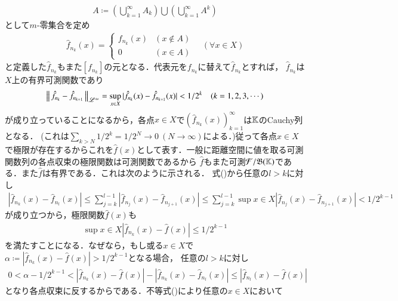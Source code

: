 \begin{qst}
\begin{prf}
\begin{description}
\begin{align}
				A \coloneqq \left( \bigcup_{k=1}^{\infty} A_k \right) \bigcup \left( \bigcup_{k=1}^{\infty} A^k \right)
			\end{align}
			として$m$-零集合を定め
			\begin{align}
				\hat{f}_{n_k}(x) =
				\begin{cases}
					f_{n_k}(x) & (x \notin A) \\
					0 & (x \in A)
				\end{cases}
				\quad (\forall x \in X)
			\end{align}
			と定義した$\hat{f}_{n_k}$もまた$[f_{n_k}]$の元となる．代表元を$f_{n_k}$に替えて$\hat{f}_{n_k}$とすれば，
			$\hat{f}_{n_k}$は$X$上の有界可測関数であり
			\begin{align}
				\left\|\, \hat{f}_{n_k} - \hat{f}_{n_{k+1}}\, \right\|_{\mathscr{L}^\infty} = \operatorname*{sup}_{x \in X} |\hat{f}_{n_k}(x) - \hat{f}_{n_{k+1}}(x)| < 1/2^k \quad (k=1,2,3,\cdots) 
				\label{ineq:Lp_banach_1}
			\end{align}
			が成り立っていることになるから，各点$x \in X$で$\left( \hat{f}_{n_k}(x) \right)_{k=1}^{\infty}$は$\mathbb{K}$のCauchy列となる．
			(これは$\sum_{k > N} 1/2^k = 1/2^N \longrightarrow 0\ (N \longrightarrow \infty)$による．)従って各点$x \in X$
			で極限が存在するからこれを$\hat{f}(x)$として表す．一般に距離空間に値を取る可測関数列の各点収束の極限関数は可測関数であるから
			$\hat{f}$もまた可測$\mathcal{F}/\mathfrak{B}(\mathbb{K})$である．また$\hat{f}$は有界である．これは次のように示される．
			式()から任意の$l > k$に対し
			\begin{align}
				|\hat{f}_{n_k}(x) - \hat{f}_{n_l}(x)| \leq \sum_{j=k}^{l-1} |\hat{f}_{n_{j}}(x) - \hat{f}_{n_{j+1}}(x)| 
				\leq \sum_{j=k}^{l-1} \sup{x \in X}{|\hat{f}_{n_j}(x) - \hat{f}_{n_{j+1}}(x)|} < 1/2^{k-1}
			\end{align}
			が成り立つから，極限関数$\hat{f}(x)$も
			\begin{align}
				\sup{x \in X}{|\hat{f}_{n_k}(x) - \hat{f}(x)|} \leq 1/2^{k-1} \label{ineq:Lp_banach_3}
			\end{align}
			を満たすことになる．なぜなら，もし或る$x \in X$で$\alpha \coloneqq |\hat{f}_{n_k}(x) - \hat{f}(x)| > 1/2^{k-1}$となる場合，
			任意の$l > k$に対し
			\begin{align}
				0 < \alpha - 1/2^{k-1} < |\hat{f}_{n_k}(x) - \hat{f}(x)| - |\hat{f}_{n_k}(x) - \hat{f}_{n_l}(x)| \leq |\hat{f}_{n_l}(x) - \hat{f}(x)|
			\end{align}
			となり各点収束に反するからである．不等式()により任意の$x \in X$において
			\begin{align}

\end{align}
\end{description}
\end{prf}
\end{qst}
